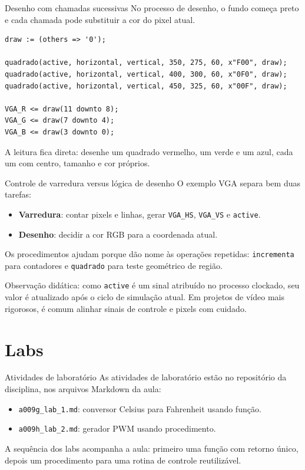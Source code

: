 \documentclass[aspectratio=169,11pt]{beamer}
\begin{document}
\begin{frame}[fragile]{Desenho com chamadas sucessivas}
    No processo de desenho, o fundo começa preto e cada chamada pode substituir a cor do pixel atual.

\begin{lstlisting}
draw := (others => '0');

quadrado(active, horizontal, vertical, 350, 275, 60, x"F00", draw);
quadrado(active, horizontal, vertical, 400, 300, 60, x"0F0", draw);
quadrado(active, horizontal, vertical, 450, 325, 60, x"00F", draw);

VGA_R <= draw(11 downto 8);
VGA_G <= draw(7 downto 4);
VGA_B <= draw(3 downto 0);
\end{lstlisting}

    \vspace{0.4em}
    A leitura fica direta: desenhe um quadrado vermelho, um verde e um azul, cada um com centro, tamanho e cor próprios.
\end{frame}

\begin{frame}{Controle de varredura versus lógica de desenho}
    O exemplo VGA separa bem duas tarefas:
    \begin{itemize}
        \item \textbf{Varredura}: contar pixels e linhas, gerar \texttt{VGA\_HS}, \texttt{VGA\_VS} e \texttt{active}.
        \item \textbf{Desenho}: decidir a cor RGB para a coordenada atual.
    \end{itemize}

    \vspace{0.5em}
    Os procedimentos ajudam porque dão nome às operações repetidas: \texttt{incrementa} para contadores e \texttt{quadrado} para teste geométrico de região.

    \vspace{0.5em}
    Observação didática: como \texttt{active} é um sinal atribuído no processo clockado, seu valor é atualizado após o ciclo de simulação atual. Em projetos de vídeo mais rigorosos, é comum alinhar sinais de controle e pixels com cuidado.
\end{frame}

\section{Labs}

\begin{frame}{Atividades de laboratório}
    As atividades de laboratório estão no repositório da disciplina, nos arquivos Markdown da aula:
    \begin{itemize}
        \item \texttt{a009g\_lab\_1.md}: conversor Celsius para Fahrenheit usando função.
        \item \texttt{a009h\_lab\_2.md}: gerador PWM usando procedimento.
    \end{itemize}

    \vspace{0.5em}
    A sequência dos labs acompanha a aula: primeiro uma função com retorno único, depois um procedimento para uma rotina de controle reutilizável.
\end{frame}
\end{document}
